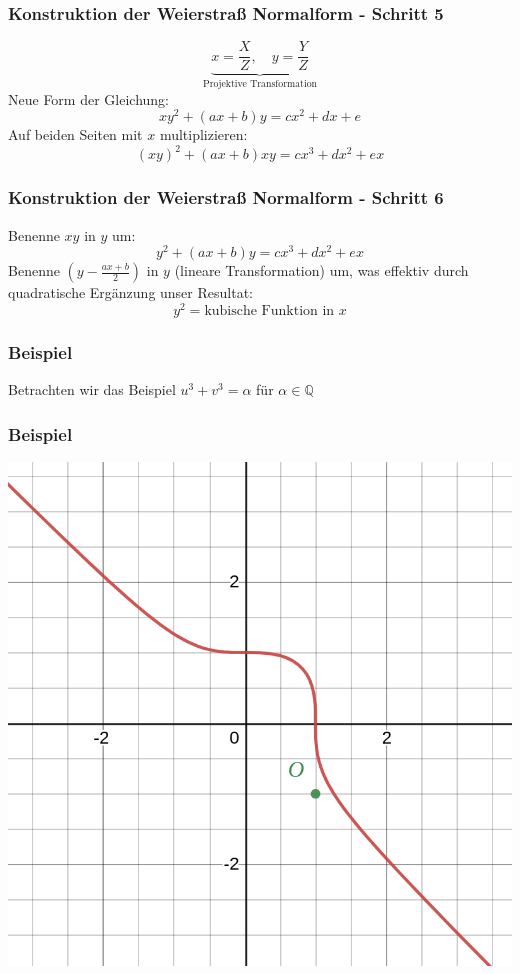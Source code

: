 \documentclass{beamer}
\begin{document}
\begin{frame}
\frametitle{Konstruktion der Weierstraß Normalform - Schritt 5}
	\[\underbrace{x=\frac{X}{Z}, \quad y=\frac{Y}{Z}}_{\text{Projektive Transformation}}\]
	Neue Form der Gleichung:
	\[xy^2+(ax+b)y=cx^2+dx+e\]
	Auf beiden Seiten mit \(x\) multiplizieren:
	\[(xy)^2+(ax+b)xy=cx^3+dx^2+ex\]
\end{frame}

\begin{frame}
\frametitle{Konstruktion der Weierstraß Normalform - Schritt 6}
	Benenne \(xy\) in \(y\) um:
	\[y^2+(ax+b)y=cx^3+dx^2+ex\]
	Benenne \(\left(y-\frac{ax+b}{2}\right)\) in \(y\)
	(lineare Transformation) um, was effektiv durch quadratische
	Ergänzung unser Resultat:
	\[y^2 = \text{kubische Funktion in } x\]
\end{frame}

\begin{frame}
\frametitle{Beispiel}
	Betrachten wir das Beispiel $u^3+v^3=\alpha$ für
	$\alpha \in\mathbb{Q}$
\end{frame}

\begin{frame}
\frametitle{Beispiel}
    \begin{center}
    \includegraphics[scale=0.3]{images/desmos-graph03.png}
    \end{center}
\end{frame}
\end{document}
